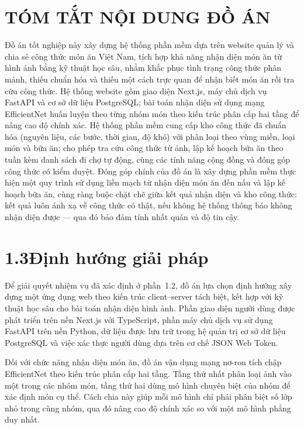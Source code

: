 \documentclass[13pt,a4paper]{article}
\begin{document}
\section*{TÓM TẮT NỘI DUNG ĐỒ ÁN}
Đồ án tốt nghiệp này xây dựng hệ thống phần mềm dựa trên website quản lý và chia sẻ công thức món ăn Việt Nam, tích hợp khả năng nhận diện món ăn từ hình ảnh bằng kỹ thuật học sâu, nhằm khắc phục tình trạng công thức phân mảnh, thiếu chuẩn hóa và thiếu một cách trực quan để nhận biết món ăn rồi tra cứu công thức. Hệ thống website gồm giao diện Next.js, máy chủ dịch vụ FastAPI và cơ sở dữ liệu PostgreSQL; bài toán nhận diện sử dụng mạng EfficientNet huấn luyện theo từng nhóm món theo kiến trúc phân cấp hai tầng để nâng cao độ chính xác. Hệ thống phần mềm cung cấp kho công thức đã chuẩn hóa (nguyên liệu, các bước, thời gian, độ khó) với phân loại theo vùng miền, loại món và bữa ăn; cho phép tra cứu công thức từ ảnh, lập kế hoạch bữa ăn theo tuần kèm danh sách đi chợ tự động, cùng các tính năng cộng đồng và đóng góp công thức có kiểm duyệt. Đóng góp chính của đồ án là xây dựng phần mềm thực hiện một quy trình sử dụng liền mạch từ nhận diện món ăn đến nấu và lập kế hoạch bữa ăn, cùng ràng buộc chặt chẽ giữa kết quả nhận diện và kho công thức: kết quả luôn ánh xạ về công thức có thật, nếu không hệ thống thông báo không nhận diện được --- qua đó bảo đảm tính nhất quán và độ tin cậy.

\section*{1.3\quad Định hướng giải pháp}
Để giải quyết nhiệm vụ đã xác định ở phần~1.2, đồ án lựa chọn định hướng xây dựng một ứng dụng web theo kiến trúc client--server tách biệt, kết hợp với kỹ thuật học sâu cho bài toán nhận diện hình ảnh. Phần giao diện người dùng được phát triển trên nền Next.js với TypeScript, phần máy chủ dịch vụ sử dụng FastAPI trên nền Python, dữ liệu được lưu trữ trong hệ quản trị cơ sở dữ liệu PostgreSQL và việc xác thực người dùng dựa trên cơ chế JSON Web Token.

Đối với chức năng nhận diện món ăn, đồ án vận dụng mạng nơ-ron tích chập EfficientNet theo kiến trúc phân cấp hai tầng. Tầng thứ nhất phân loại ảnh vào một trong các nhóm món, tầng thứ hai dùng mô hình chuyên biệt của nhóm để xác định món cụ thể. Cách chia này giúp mỗi mô hình chỉ phải phân biệt số lớp nhỏ trong cùng nhóm, qua đó nâng cao độ chính xác so với một mô hình phẳng duy nhất.
\end{document}
